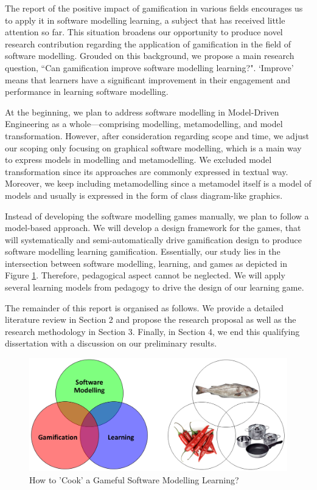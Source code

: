 \documentclass[12pt, a4paper]{report}
\begin{document}
The report of the positive impact of gamification in various fields encourages us to apply it in software modelling learning, a subject that has received little attention so far. This situation broadens our opportunity to produce novel research contribution regarding the application of gamification in the field of software modelling. Grouded on this background, we propose a main research question, ``Can gamification improve software modelling learning?". `Improve' means that learners have a significant improvement in their engagement and performance in learning software modelling.   

At the beginning, we plan to address software modelling in  Model-Driven Engineering as a whole---comprising modelling, metamodelling, and model transformation. However, after consideration regarding scope and time, we adjust our scoping only focusing on graphical software modelling, which is a main way to express models in modelling and metamodelling. We excluded model transformation since its approaches are commonly expressed in textual way. Moreover, we keep including metamodelling since a metamodel itself is a model of models and usually is expressed in the form of class diagram-like graphics.     

Instead of developing the software modelling games manually, we plan to follow a model-based approach. We will develop a design framework for the games, that will systematically and semi-automatically drive gamification design to produce software modelling learning gamification. Essentially, our study lies in the intersection between software modelling, learning, and games as depicted in Figure \ref{smlg}. Therefore, pedagogical aspect cannot be neglected. We will apply several learning models from pedagogy to drive the design of our learning game. 

The remainder of this report is organised as follows. We provide a detailed literature review in Section 2 and propose the research proposal as well as the research methodology in Section 3. Finally, in Section 4, we end this qualifying dissertation with a discussion on our preliminary results. 

\begin{figure}[ht]
\centering
\includegraphics[width=\textwidth]{smlg}
\caption{How to 'Cook' a Gameful Software Modelling Learning?}
\label{smlg}
\end{figure}
\end{document}
